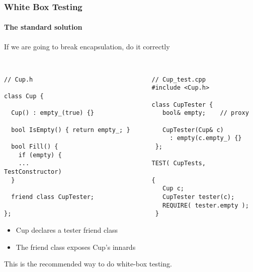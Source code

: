 \begin{frame}[fragile,t]
\frametitle{White Box Testing}
\framesubtitle {The standard solution}
If we are going to break encapsulation, do it correctly
{\scriptsize\
\begin{verbatim}
// Cup.h                                 // Cup_test.cpp
                                         #include <Cup.h>
class Cup {                              
                                         class CupTester {
  Cup() : empty_(true) {}                   bool& empty;    // proxy 
                                            
  bool IsEmpty() { return empty_; }         CupTester(Cup& c) 
                                              : empty(c.empty_) {}
  bool Fill() {                           };  
    if (empty) {                         
    ...                                  TEST( CupTests, TestConstructor)     
  }                                      {                                    
                                            Cup c;                            
  friend class CupTester;                   CupTester tester(c);
                                            REQUIRE( tester.empty ); 
};                                        }
\end{verbatim}}
\begin{itemize}
\item Cup declares a tester friend class
\item The friend class exposes Cup's innards
\end{itemize}
This is the recommended way to do white-box testing.
\end{frame}

